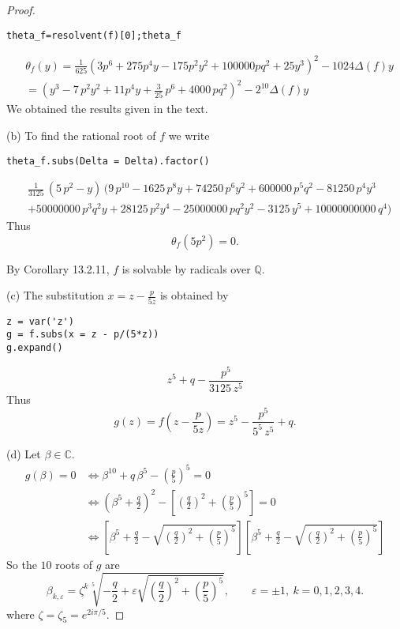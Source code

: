 \documentclass[11pt,a4paper]{article}
\newcommand{\Q}{\mathbb{Q}}
\newcommand{\C}{\mathbb{C}}
\begin{document}
\begin{proof}
\begin{verbatim}
theta_f=resolvent(f)[0];theta_f
\end{verbatim}
\begin{align*}
&\theta_f(y) = \frac{1}{625} \left(3 p^{6} +275 p^{4}y-175 p^{2}y^2+ 100000 p q^{2}+25y^3\right)^2 - 1024\Delta(f) y\\
& = \left(y^3-7 \, p^{2}y^2+11 p^{4}y+\frac{3}{25} \, p^{6} + 4000 \, p q^{2}\right)^2 - 2^{10}\Delta(f) y
\end{align*}
We obtained the results given in the text.

\item[(b)]
To find the rational root of $f$ we write
\begin{verbatim}
theta_f.subs(Delta = Delta).factor()
\end{verbatim} 
\begin{align*}
&\frac{1}{3125} \, (5 \, p^{2} - y)\, (9 \, p^{10} - 1625 \, p^{8} y + 74250 \, p^{6} y^{2} + 600000 \, p^{5} q^{2} - 81250 \, p^{4} y^{3}\\
& + 50000000 \, p^{3} q^{2} y + 28125 \, p^{2} y^{4} - 25000000 \, p q^{2} y^{2} - 3125 \, y^{5} + 10000000000 \, q^{4})
\end{align*}
Thus $$\theta_f(5p^2) = 0.$$

By Corollary 13.2.11, $f$ is solvable by radicals over $\Q$.

\item[(c)] The substitution $x = z - \frac{p}{5z}$ is obtained by
\begin{verbatim}
z = var('z')
g = f.subs(x = z - p/(5*z))
g.expand()
\end{verbatim}
$$z^{5} + q - \frac{p^{5}}{3125 \, z^{5}}$$
Thus
$$g(z) = f\left( z - \frac{p}{5z}\right) = z^5 - \frac{p^{5}}{5^5 \, z^{5}} +q.$$

\item[(d)] Let $\beta \in \C$.
\begin{align*}
g(\beta) = 0 &\iff \beta^{10} +q\,\beta^5 -\left(\frac{p}{5}\right)^5 = 0\\
&\iff\left(\beta^5 +\frac{q}{2} \right)^2 - \left[ \left(\frac{q}{2}\right)^2 + \left(\frac{p}{5}\right)^5\right] = 0\\
&\iff \left[ \beta^5 + \frac{q}{2} - \sqrt{ \left(\frac{q}{2}\right)^2 + \left(\frac{p}{5}\right)^5 } \right]\left[ \beta^5 + \frac{q}{2} - \sqrt{ \left(\frac{q}{2}\right)^2 + \left(\frac{p}{5}\right)^5 } \right]
\end{align*}
So the $10$ roots of $g$ are
$$\beta_{k,\varepsilon} = \zeta^k \sqrt[5]{- \frac{q}{2} + \varepsilon \sqrt{ \left(\frac{q}{2}\right)^2 + \left(\frac{p}{5}\right)^5 }},\qquad\varepsilon = \pm 1,\  k=0,1,2,3,4.$$
where $\zeta = \zeta_5 = e^{2i\pi/5}$.


\end{proof}
\end{document}

